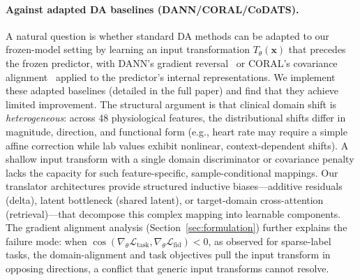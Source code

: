 \paragraph{Against adapted DA baselines (DANN/CORAL/CoDATS).}
A natural question is whether standard DA methods can be adapted to our
frozen-model setting by learning an input transformation $T_\theta(\mathbf{x})$
that precedes the frozen predictor, with DANN's gradient reversal~\cite{ganin2016dann}
or CORAL's covariance alignment~\cite{sun2016coral} applied to the predictor's
internal representations.
We implement these adapted baselines (detailed in the full paper) and
find that they achieve limited improvement.
The structural argument is that clinical domain shift is \emph{heterogeneous}:
across 48 physiological features, the distributional shifts differ in magnitude,
direction, and functional form (e.g., heart rate may require a simple affine
correction while lab values exhibit nonlinear, context-dependent shifts).
A shallow input transform with a single domain discriminator or covariance
penalty lacks the capacity for such feature-specific, sample-conditional
mappings.
Our translator architectures provide structured inductive biases---additive
residuals (delta), latent bottleneck (shared latent), or target-domain cross-attention
(retrieval)---that decompose this complex mapping into learnable components.
The gradient alignment analysis (Section~\ref{sec:formulation}) further
explains the failure mode: when $\cos(\nabla_\theta \mathcal{L}_\text{task},
\nabla_\theta \mathcal{L}_\text{fid}) < 0$, as observed for sparse-label tasks,
the domain-alignment and task objectives pull the input transform in
opposing directions, a conflict that generic input transforms cannot resolve.

